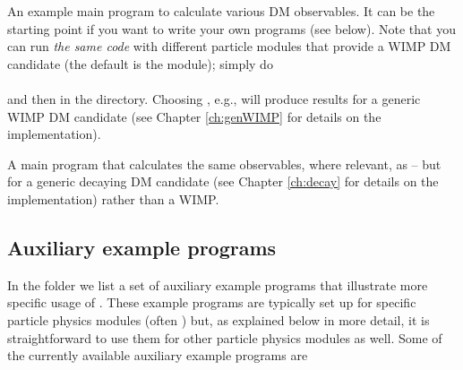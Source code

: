 \begin{description}

\item{} An example main program to calculate various DM observables. It can be the starting point if you want to write 
your own programs (see below).
Note that you can run {\it the same code} with different particle modules that provide a WIMP DM candidate (the default is the  module);
simply do\\
{}\\
 and then  in the  directory.
Choosing , e.g., will produce results for a generic WIMP DM candidate 
(see Chapter \ref{ch:genWIMP} for details on the implementation).

\item{} A main program that calculates the same observables, where relevant, as   -- but for a
generic decaying DM candidate (see Chapter \ref{ch:decay} for details on the implementation) rather than a WIMP.
\end{description}


\subsection{Auxiliary example programs}
\label{sec:aux_ex}

In the folder  we list a set of auxiliary example programs that illustrate
more specific usage of \ds. These example programs are typically set up for specific particle physics 
modules (often )  but, as explained below in more detail, it is straightforward to use them 
for other particle physics modules as well.
%
Some of the currently available auxiliary example programs are

